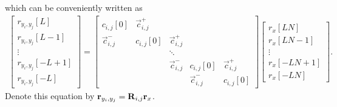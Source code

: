 \documentclass[a4paper, openany, oneside]{memoir}
\begin{document}
which can be conveniently written as
\begin{align*}
    \begin{bmatrix}
        r_{y_i,y_j}[L] \\
        r_{y_i,y_j}[L-1] \\
        \vdots \\
        r_{y_i,y_j}[-L+1] \\
        r_{y_i,y_j}[-L]
    \end{bmatrix} = \begin{bmatrix}
        c_{i,j}[0] & \vec{c}^+_{i,j} \\
        \vec{c}^{-}_{i,j} & c_{i,j}[0] & \vec{c}^{+}_{i,j} \\
        &&\ddots \\
        &&\vec{c}^{-}_{i,j} & c_{i,j}[0] & \vec{c}^{+}_{i,j} \\
        &&&\vec{c}^{-}_{i,j} & c_{i,j}[0]
    \end{bmatrix} \begin{bmatrix}
        r_x[LN] \\
        r_x[LN-1] \\
        \vdots \\
        r_x[-LN+1] \\
        r_x[-LN]
    \end{bmatrix}.
\end{align*}
Denote this equation by $\boldsymbol{\mathbf{r}}_{y_i,y_j} = \boldsymbol{\mathbf{R}}_{i,j} \boldsymbol{\mathbf{r}}_x$.
\end{document}
